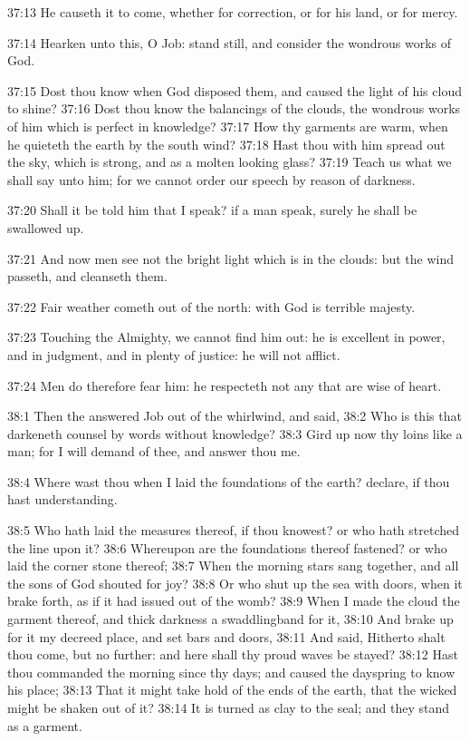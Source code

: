37:13 He causeth it to come, whether for correction, or for his land,
or for mercy.

37:14 Hearken unto this, O Job: stand still, and consider the wondrous
works of God.

37:15 Dost thou know when God disposed them, and caused the light of
his cloud to shine?  37:16 Dost thou know the balancings of the
clouds, the wondrous works of him which is perfect in knowledge?
37:17 How thy garments are warm, when he quieteth the earth by the
south wind?  37:18 Hast thou with him spread out the sky, which is
strong, and as a molten looking glass?  37:19 Teach us what we shall
say unto him; for we cannot order our speech by reason of darkness.

37:20 Shall it be told him that I speak? if a man speak, surely he
shall be swallowed up.

37:21 And now men see not the bright light which is in the clouds: but
the wind passeth, and cleanseth them.

37:22 Fair weather cometh out of the north: with God is terrible
majesty.

37:23 Touching the Almighty, we cannot find him out: he is excellent
in power, and in judgment, and in plenty of justice: he will not
afflict.

37:24 Men do therefore fear him: he respecteth not any that are wise
of heart.

38:1 Then the \LORD answered Job out of the whirlwind, and said, 38:2
Who is this that darkeneth counsel by words without knowledge?  38:3
Gird up now thy loins like a man; for I will demand of thee, and
answer thou me.

38:4 Where wast thou when I laid the foundations of the earth?
declare, if thou hast understanding.

38:5 Who hath laid the measures thereof, if thou knowest? or who hath
stretched the line upon it?  38:6 Whereupon are the foundations
thereof fastened? or who laid the corner stone thereof; 38:7 When the
morning stars sang together, and all the sons of God shouted for joy?
38:8 Or who shut up the sea with doors, when it brake forth, as if it
had issued out of the womb?  38:9 When I made the cloud the garment
thereof, and thick darkness a swaddlingband for it, 38:10 And brake up
for it my decreed place, and set bars and doors, 38:11 And said,
Hitherto shalt thou come, but no further: and here shall thy proud
waves be stayed?  38:12 Hast thou commanded the morning since thy
days; and caused the dayspring to know his place; 38:13 That it might
take hold of the ends of the earth, that the wicked might be shaken
out of it?  38:14 It is turned as clay to the seal; and they stand as
a garment.

